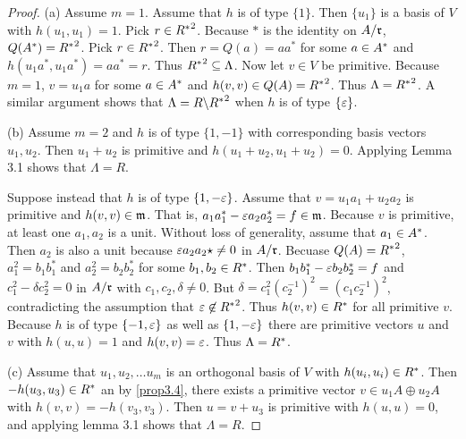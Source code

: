 \begin{proof}
(a) Assume $m=1$.
Assume that $h$ is of type $\{1\}$.
Then $\{u_1\}$ is a basis of $V$ with $h(u_1, u_1) = 1$. Pick $r \in {R^*}^2$. Because $*$ is the identity on $A / \mathfrak{r}$, $Q(A^*) = {R^*}^2$.
Pick $r \in {R^*}^2$.
Then $r = Q(a) = a a^*$ for some $a \in A^*$ and $h(u_1 a^*, u_1 a^*) = aa^* = r$.
Thus ${R^*}^2 \subseteq \Lambda$.
Now let $v \in V$ be primitive.
Because $m=1$, $v = u_1 a$ for some $a \in A^*$ and $h(v, v) \in Q(A) = {R^*}^2$.
Thus $\Lambda = {R^*}^2$.
A similar argument shows that $\Lambda = R \backslash {R^*}^2$ when $h$ is of type $\{\varepsilon\}$.

(b) Assume $m = 2$ and $h$ is of type $\{1, -1\}$ with corresponding basis vectors $u_1, u_2$.
Then $u_1 + u_2$ is primitive and $h(u_1 + u_2, u_1 + u_2) = 0$.
Applying Lemma 3.1 shows that $\Lambda = R$.

Suppose instead that $h$ is of type $\{1, -\varepsilon\}$.
Assume that $v = u_1 a_1 + u_2 a_2$ is primitive and $h(v,v) \in \mathfrak{m}$.
That is, $a_1 a_1^* - \varepsilon a_2 a_2^* = f \in \mathfrak{m}$.
Because $v$ is primitive, at least one $a_1, a_2$ is a unit.
Without loss of generality, assume that $a_1 \in A^*$.
Then $a_2$ is also a unit because $\varepsilon a_2 a_2 \star \ne 0$ in $A / \mathfrak{r}$.
Becuase $Q(A) = {R^*}^2$, $a_1^2 = b_1 b_1^*$ and $a_2^2 = b_2 b_2^*$ for some $b_1, b_2 \in R^*$. 
Then $b_1 b_1^* - \varepsilon b_2 b_2^* = f$ and $c_1^2 - \delta c_2^2 = 0$ in $A / \mathfrak{r}$ with $c_1, c_2, \delta \ne 0$.
But $\delta = c_1^2 (c_2^{-1})^2 = (c_1 c_2^{-1})^2$, contradicting the assumption that $\varepsilon \not\in {R^*}^2$.
Thus $h(v,v) \in R^*$ for all primitive $v$.
Because $h$ is of type $\{-1, \varepsilon \}$ as well as $\{1, -\varepsilon\}$ there are primitive vectors $u$ and $v$ with $h(u,u) = 1$ and $h(v,v) = \varepsilon$.
Thus $\Lambda = R^*$.

(c) Assume that $u_1, u_2, \dotsc u_m$ is an orthogonal basis of $V$ with $h(u_i, u_i) \in R^*$.
Then $-h(u_3, u_3) \in R^*$ an by \cref{prop3.4}, there exists a primitive vector $v \in u_1 A \oplus u_2 A$ with $h(v,v) = -h(v_3, v_3)$.
Then $u = v + u_3$ is primitive with $h(u,u) = 0$, and applying lemma 3.1 shows that $\Lambda = R$.
\end{proof}

